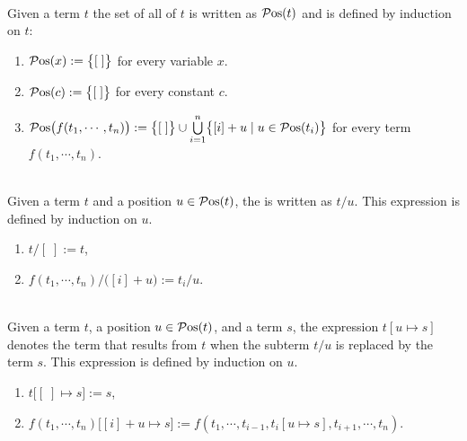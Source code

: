 \begin{Definition} \hspace*{\fill} \\
  Given a term $t$ the set of all  of $t$ is written as $\mathcal{P}\mathrm{os}(t)$ and is defined by
  induction on $t$:
  \begin{enumerate}
  \item $\mathcal{P}\mathrm{os}(x) := \bigl\{ [\;] \bigr\}$ \quad for every variable $x$.
  \item $\mathcal{P}\mathrm{os}(c) := \bigl\{ [\;] \bigr\}$ \quad for every constant $c$.
  \item $\mathcal{P}\mathrm{os}\bigl(f(t_1,\cdots,t_n)\bigr) := 
         \bigl\{ [\;] \bigr\} \cup \bigcup\limits_{i=1}^n \bigl\{ [i] + u \mid u \in \mathcal{P}\mathrm{os}(t_i) \bigr\}$ 
        \quad for every term $f(t_1,\cdots,t_n)$. \eoxs
  \end{enumerate}
\end{Definition}

\begin{Definition} \hspace*{\fill} \\
  Given a term $t$ and a position $u \in \mathcal{P}\mathrm{os}(t)$, the  is
  written as $t/u$.  This expression is defined by induction on $u$.
  \begin{enumerate}
  \item $t/[\;] := t$,
  \item $f(t_1,\cdots,t_n)/\bigl([i]+u\bigr) := t_i/u$.  \eoxs
  \end{enumerate}
\end{Definition}

\begin{Definition} \hspace*{\fill} \\
  Given a term $t$, a position $u \in \mathcal{P}\mathrm{os}(t)$, and a term $s$, the expression
  $t[u \mapsto s]$ denotes the term that results from $t$ when the subterm $t/u$ is replaced by the term 
  $s$.  This expression is defined by induction on $u$.
  \begin{enumerate}
  \item $t\bigl[ [\;] \mapsto s \bigr] := s$,
  \item $f(t_1,\cdots,t_n)\bigl[ [i]+u \mapsto s \bigr] := f(t_1, \cdots, t_{i-1},t_i[u \mapsto s], t_{i+1},\cdots, t_n)$.  
        \eoxs
  \end{enumerate}
\end{Definition}
  
